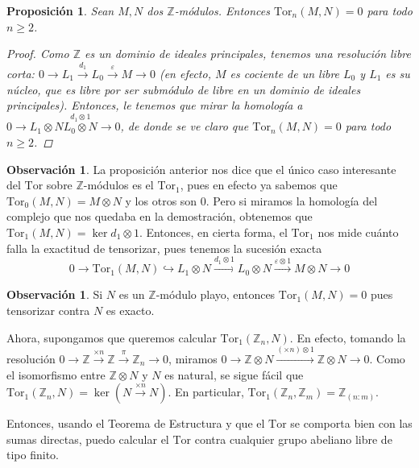 \documentclass[12pt]{book}
\newtheorem{prop}[teo]{Proposición}
\theoremstyle{definition}
\newtheorem{obs}[teo]{Observación}
\newcommand{\ZZ}{\mathbb{Z}}      %
\begin{document}
\begin{prop}
Sean $M,N$ dos $\ZZ$-módulos. Entonces $\mathrm{Tor}_n(M,N)=0$ para todo $n\geq 2$.
\begin{proof}
Como $\ZZ$ es un dominio de ideales principales, tenemos una resolución libre corta: $0\longrightarrow L_1\stackrel{d_1}{\longrightarrow}L_0\stackrel{\varepsilon}{\longrightarrow}M\longrightarrow 0$ (en efecto, $M$ es cociente de un libre $L_0$ y $L_1$ es su núcleo, que es libre por ser submódulo de libre en un dominio de ideales principales). Entonces, le tenemos que mirar la homología a $0\longrightarrow L_1\otimes N\stackrel{d_1\otimes 1}{L_0\otimes N}\longrightarrow 0$, de donde se ve claro que $\mathrm{Tor}_n(M,N)=0$ para todo $n\geq 2$.
\end{proof}
\end{prop}

\begin{obs}
La proposición anterior nos dice que el único caso interesante del $\mathrm{Tor}$ sobre $\ZZ$-módulos es el $\mathrm{Tor}_1$, pues en efecto ya sabemos que $\mathrm{Tor}_0(M,N)=M\otimes N$ y los otros son $0$. Pero si miramos la homología del complejo que nos quedaba en la demostración, obtenemos que $\mathrm{Tor}_1(M,N) = \ker d_1\otimes 1$. Entonces, en cierta forma, el $\mathrm{Tor}_1$ nos mide cuánto falla la exactitud de tensorizar, pues tenemos la sucesión exacta $$0\longrightarrow \mathrm{Tor}_1(M,N) \hookrightarrow L_1\otimes N\stackrel{d_1\otimes 1}{\longrightarrow} L_0\otimes N\stackrel{\varepsilon\otimes 1}{\longrightarrow} M\otimes N\longrightarrow 0$$
\end{obs}

\begin{obs}
Si $N$ es un $\ZZ$-módulo playo, entonces $\mathrm{Tor}_1(M,N)=0$ pues tensorizar contra $N$ es exacto.

Ahora, supongamos que queremos calcular $\mathrm{Tor}_1(\ZZ_n,N)$. En efecto, tomando la resolución $0\longrightarrow \ZZ\stackrel{\times n}{\longrightarrow}\ZZ\stackrel{\pi}{\longrightarrow} \ZZ_n\longrightarrow 0$, miramos $0\longrightarrow \ZZ\otimes N\stackrel{(\times n)\otimes 1}{\longrightarrow} \ZZ\otimes N\longrightarrow 0$. Como el isomorfismo entre $\ZZ\otimes N$ y $N$ es natural, se sigue fácil que $\mathrm{Tor}_1(\ZZ_n,N) = \ker(N\stackrel{\times n}{\longrightarrow} N)$. En particular, $\mathrm{Tor}_1(\ZZ_n,\ZZ_m)=\ZZ_{(n:m)}$.

Entonces, usando el Teorema de Estructura y que el $\mathrm{Tor}$ se comporta bien con las sumas directas, puedo calcular el $\mathrm{Tor}$ contra cualquier grupo abeliano libre de tipo finito.
\end{obs}
\end{document}
